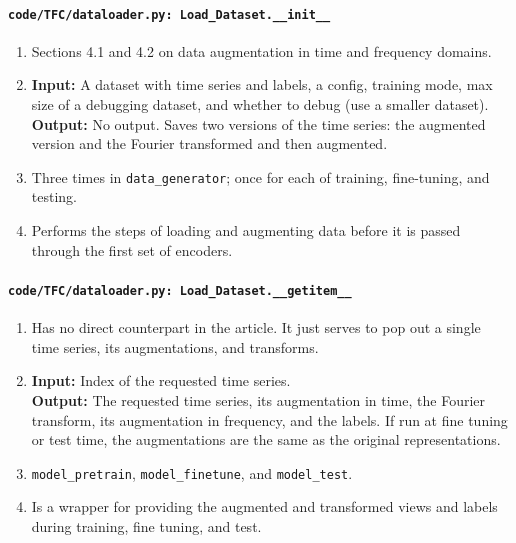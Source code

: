 \documentclass[a4paper,11pt]{article}
\newcommand{\code}[1]{\texttt{#1}}
\begin{document}
\paragraph{\code{code/TFC/dataloader.py: Load\_Dataset.\_\_init\_\_}}
\begin{enumerate}[label=(\roman*)]
\item Sections 4.1 and 4.2 on data augmentation in time and frequency domains.
\item 
    \textbf{Input:} A dataset with time series and labels, a config, training mode, max size of a debugging dataset, and whether to debug (use a smaller dataset). \\
    \textbf{Output:} No output. Saves two versions of the time series: the augmented version and the Fourier transformed and then augmented.
\item Three times in \texttt{data\_generator}; once for each of training, fine-tuning, and testing.
\item Performs the steps of loading and augmenting data before it is passed through the first set of encoders.
\end{enumerate}

\paragraph{\code{code/TFC/dataloader.py: Load\_Dataset.\_\_getitem\_\_}}
\begin{enumerate}[label=(\roman*)]
\item Has no direct counterpart in the article. It just serves to pop out a single time series, its augmentations, and transforms.
\item 
    \textbf{Input:} Index of the requested time series.\\
    \textbf{Output:} The requested time series, its augmentation in time, the Fourier transform, its augmentation in frequency, and the labels. If run at fine tuning or test time, the augmentations are the same as the original representations.
\item \texttt{model\_pretrain}, \texttt{model\_finetune}, and \texttt{model\_test}.
\item Is a wrapper for providing the augmented and transformed views and labels during training, fine tuning, and test.
\end{enumerate}
\end{document}
